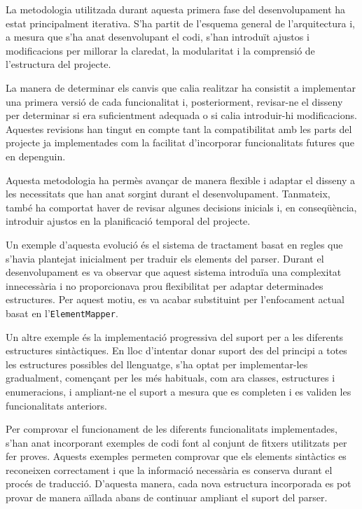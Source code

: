La metodologia utilitzada durant aquesta primera fase del desenvolupament ha estat principalment iterativa. S'ha partit de l'esquema general de l'arquitectura i, a mesura que s'ha anat desenvolupant el codi, s'han introduït ajustos i modificacions per millorar la claredat, la modularitat i la comprensió de l'estructura del projecte.

La manera de determinar els canvis que calia realitzar ha consistit a implementar una primera versió de cada funcionalitat i, posteriorment, revisar-ne el disseny per determinar si era suficientment adequada o si calia introduir-hi modificacions. Aquestes revisions han tingut en compte tant la compatibilitat amb les parts del projecte ja implementades com la facilitat d'incorporar funcionalitats futures que en depenguin.

Aquesta metodologia ha permès avançar de manera flexible i adaptar el disseny a les necessitats que han anat sorgint durant el desenvolupament. Tanmateix, també ha comportat haver de revisar algunes decisions inicials i, en conseqüència, introduir ajustos en la planificació temporal del projecte.

Un exemple d'aquesta evolució és el sistema de tractament basat en regles que s'havia plantejat inicialment per traduir els elements del parser. Durant el desenvolupament es va observar que aquest sistema introduïa una complexitat innecessària i no proporcionava prou flexibilitat per adaptar determinades estructures. Per aquest motiu, es va acabar substituint per l'enfocament actual basat en l'\texttt{ElementMapper}.

Un altre exemple és la implementació progressiva del suport per a les diferents estructures sintàctiques. En lloc d'intentar donar suport des del principi a totes les estructures possibles del llenguatge, s'ha optat per implementar-les gradualment, començant per les més habituals, com ara classes, estructures i enumeracions, i ampliant-ne el suport a mesura que es completen i es validen les funcionalitats anteriors.

Per comprovar el funcionament de les diferents funcionalitats implementades, s'han anat incorporant exemples de codi font al conjunt de fitxers utilitzats per fer proves. Aquests exemples permeten comprovar que els elements sintàctics es reconeixen correctament i que la informació necessària es conserva durant el procés de traducció. D'aquesta manera, cada nova estructura incorporada es pot provar de manera aïllada abans de continuar ampliant el suport del parser.

